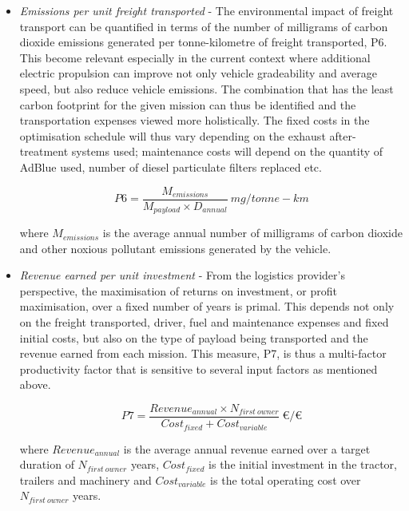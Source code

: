 \documentclass[ExampleMasters.tex]{subfiles}
\begin{document}
\begin{itemize}
			\item \textit{Emissions per unit freight transported} - The environmental impact of freight transport can be quantified in terms of the number of milligrams of carbon dioxide emissions generated per tonne-kilometre of freight transported, P6. This become relevant especially in the current context where additional electric propulsion can improve not only vehicle gradeability and average speed, but also reduce vehicle emissions. The combination that has the least carbon footprint for the given mission can thus be identified and the transportation expenses viewed more holistically. The fixed costs in the optimisation schedule will thus vary depending on the exhaust after-treatment systems used; maintenance costs will depend on the quantity of AdBlue used, number of diesel particulate filters replaced etc.

			\begin{equation}
				P6 = \frac{M_{emissions}}{M_{payload} \times D_{annual}}\  mg/tonne-km
			\end{equation}

			where $M_{emissions}$ is the average annual number of milligrams of carbon dioxide and other noxious pollutant emissions generated by the vehicle.

			\item \textit{Revenue earned per unit investment} - From the logistics provider's perspective, the maximisation of returns on investment, or profit maximisation, over a fixed number of years is primal. This depends not only on the freight transported, driver, fuel and maintenance expenses and fixed initial costs, but also on the type of payload being transported and the revenue earned from each mission. This measure, P7, is thus a multi-factor productivity factor that is sensitive to several input factors as mentioned above.

			\begin{equation}
				P7 = \frac{Revenue_{annual} \times N_{first\ owner}}{Cost_{fixed} + Cost_{variable}}\ \euro/\euro
			\end{equation}

			where $Revenue_{annual}$ is the average annual revenue earned over a target duration of $N_{first\ owner}$ years, $Cost_{fixed}$ is the initial investment in the tractor, trailers and machinery and $Cost_{variable}$ is the total operating cost over $N_{first\ owner}$ years.

		\end{itemize}
\end{document}
